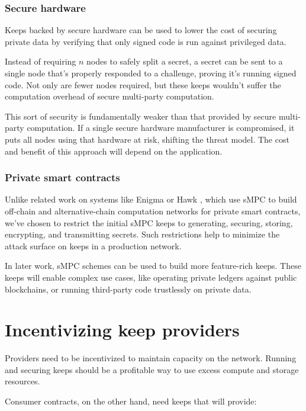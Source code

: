 \documentclass[11pt]{article}
\begin{document}
\subsubsection{Secure hardware}

Keeps backed by secure hardware can be used to lower the cost of
securing private data by verifying that only signed code is run
against privileged data.

Instead of requiring $n$ nodes to safely split a secret, a secret can
be sent to a single node that's properly responded to a challenge,
proving it's running signed code. Not only are fewer nodes required,
but these keeps wouldn't suffer the computation overhead of secure
multi-party computation.

This sort of security is fundamentally weaker than that provided by
secure multi-party computation. If a single secure hardware
manufacturer is compromised, it puts all nodes using that hardware at
risk, shifting the threat model. The cost and benefit of this approach
will depend on the application.

\subsubsection{Private smart contracts}

Unlike related work on systems like Enigma \cite{enigma} or Hawk
\cite{hawk}, which use sMPC to build off-chain and alternative-chain
computation networks for private smart contracts, we've chosen to
restrict the initial sMPC keeps to generating, securing, storing,
encrypting, and transmitting secrets. Such restrictions help to
minimize the attack surface on keeps in a production network.

In later work, sMPC schemes can be used to build more feature-rich
keeps. These keeps will enable complex use cases, like operating
private ledgers against public blockchains, or running third-party
code trustlessly on private data.

\section{Incentivizing keep providers} \label{incentivizingProviders}

Providers need to be incentivized to maintain capacity on the network.
Running and securing keeps should be a profitable way to use excess
compute and storage resources.

Consumer contracts, on the other hand, need keeps that will provide:
\end{document}
